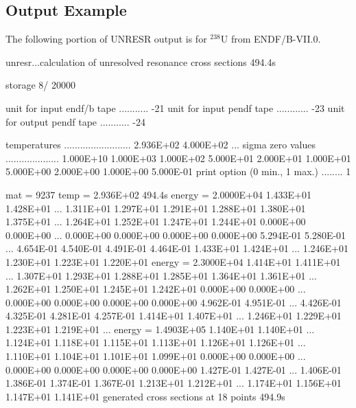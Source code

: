 \subsection{Output Example}
\label{ssUNRESR_output}

The following portion of UNRESR output is for $^{238}$U from
ENDF/B-VII.0.

\small
\begin{ccode}

 unresr...calculation of unresolved resonance cross sections          494.4s

                                                        storage   8/   20000

 unit for input endf/b tape ...........        -21
 unit for input pendf tape ............        -23
 unit for output pendf tape ...........        -24

 temperatures .........................  2.936E+02
                                         4.000E+02
                                          ...
 sigma zero values ....................  1.000E+10
                                         1.000E+03
                                         1.000E+02
                                         5.000E+01
                                         2.000E+01
                                         1.000E+01
                                         5.000E+00
                                         2.000E+00
                                         1.000E+00
                                         5.000E-01
 print option (0 min., 1 max.) ........          1

 mat = 9237    temp =  2.936E+02                                      494.4s
 energy =  2.0000E+04
   1.433E+01  1.428E+01  ... 1.311E+01  1.297E+01 1.291E+01  1.288E+01
   1.380E+01  1.375E+01  ... 1.264E+01  1.252E+01 1.247E+01  1.244E+01
   0.000E+00  0.000E+00  ... 0.000E+00  0.000E+00 0.000E+00  0.000E+00
   5.294E-01  5.280E-01  ... 4.654E-01  4.540E-01 4.491E-01  4.464E-01
   1.433E+01  1.424E+01  ... 1.246E+01  1.230E+01 1.223E+01  1.220E+01
 energy =  2.3000E+04
   1.414E+01  1.411E+01  ... 1.307E+01  1.293E+01 1.288E+01  1.285E+01
   1.364E+01  1.361E+01  ... 1.262E+01  1.250E+01 1.245E+01  1.242E+01
   0.000E+00  0.000E+00  ... 0.000E+00  0.000E+00 0.000E+00  0.000E+00
   4.962E-01  4.951E-01  ... 4.426E-01  4.325E-01 4.281E-01  4.257E-01
   1.414E+01  1.407E+01  ... 1.246E+01  1.229E+01 1.223E+01  1.219E+01
   ...
 energy =  1.4903E+05
   1.140E+01  1.140E+01  ... 1.124E+01  1.118E+01 1.115E+01  1.113E+01
   1.126E+01  1.126E+01  ... 1.110E+01  1.104E+01 1.101E+01  1.099E+01
   0.000E+00  0.000E+00  ... 0.000E+00  0.000E+00 0.000E+00  0.000E+00
   1.427E-01  1.427E-01  ... 1.406E-01  1.386E-01 1.374E-01  1.367E-01
   1.213E+01  1.212E+01  ... 1.174E+01  1.156E+01 1.147E+01  1.141E+01
 generated cross sections at  18 points                               494.9s

\end{ccode}
\normalsize

